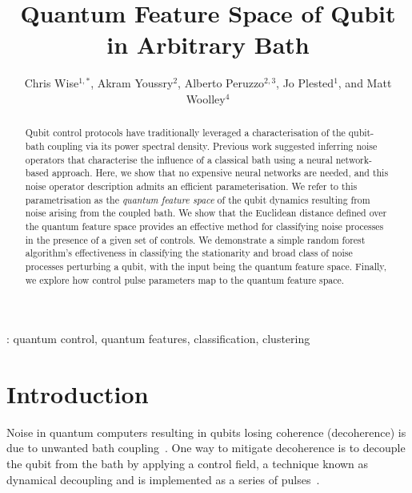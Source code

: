 \documentclass[12pt]{iopart}
\begin{document}
\title[Quantum Feature Space of Qubit in Arbitrary Bath]{Quantum Feature Space of Qubit in Arbitrary Bath}

\author{Chris Wise$^{1,*}$, Akram Youssry$^{2}$, Alberto Peruzzo$^{2,3}$, Jo Plested$^{1}$, and Matt Woolley$^4$}

\address{$^1$School of Systems and Computing, University of New South Wales, Canberra, ACT, 2601, Australia}
\address{$^2$Quantum Photonics Laboratory and Centre for Quantum Computation and Communication Technology, RMIT University, Melbourne, VIC 3000, Australia}
\address{$^3$Qubit Pharmaceuticals, Advanced Research Department, Paris, France}
\address{$^4$Centre for Engineered Quantum Systems, University of New South Wales, Canberra, ACT, 2601, Australia}
\address{$^*$Author to whom any correspondence should be addressed.}

\begin{abstract}
    Qubit control protocols have traditionally leveraged a characterisation of the qubit-bath coupling via its power spectral density. Previous work suggested inferring noise operators that characterise the influence of a classical bath using a neural network-based approach. Here, we show that no expensive neural networks are needed, and this noise operator description admits an efficient parameterisation. We refer to this parametrisation as the \textit{quantum feature space} of the qubit dynamics resulting from noise arising from the coupled bath. We show that the Euclidean distance defined over the quantum feature space provides an effective method for classifying noise processes in the presence of a given set of controls. We demonstrate a simple random forest algorithm's effectiveness in classifying the stationarity and broad class of noise processes perturbing a qubit, with the input being the quantum feature space. Finally, we explore how control pulse parameters map to the quantum feature space.
\end{abstract}

\vspace{2pc}
:  quantum control, quantum features, classification, clustering

\section{Introduction}
Noise in quantum computers resulting in qubits losing coherence (decoherence) is due to unwanted bath coupling~\cite{bravyi2018correcting}. One way to mitigate decoherence is to decouple the qubit from the bath by applying a control field, a technique known as dynamical decoupling and is implemented as a series of pulses~\cite{viola1999dynamical}.
\end{document}
